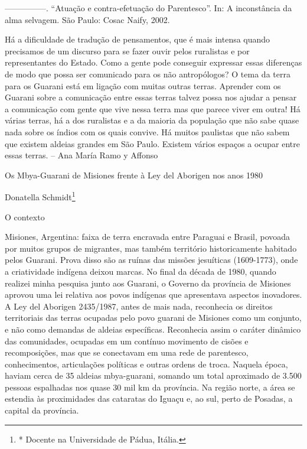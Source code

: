 \documentclass{article}
\begin{document}
{}---{}---{}---{}---{}---. {\textquotedblleft}Atua\c{c}\~ao e
contra-efetua\c{c}\~ao do Parentesco{\textquotedblright}. In: A
inconst\^ancia da alma selvagem. S\~ao Paulo: Cosac Naify, 2002.

H\'a a dificuldade de tradu\c{c}\~ao de pensamentos, que \'e mais
intensa quando precisamos de um discurso para se fazer ouvir pelos
ruralistas e por representantes do Estado. Como a gente pode conseguir
expressar essas diferen\c{c}as de modo que possa ser comunicado para os
n\~ao antrop\'ologos? O tema da terra para os Guarani est\'a em
liga\c{c}\~ao com muitas outras terras. Aprender com os Guarani sobre a
comunica\c{c}\~ao entre essas terras talvez possa nos ajudar a pensar a
comunica\c{c}\~ao com gente que vive nessa terra mas que parece viver
em outra! H\'a v\'arias terras, h\'a a dos ruralistas e a da maioria da
popula\c{c}\~ao que n\~ao sabe quase nada sobre os \'indios com os
quais convive. H\'a muitos paulistas que n\~ao sabem que existem
aldeias grandes em S\~ao Paulo. Existem v\'arios espa\c{c}os a ocupar
entre essas terras. -- Ana Mar\'ia Ramo y Affonso

Os Mbya-Guarani de Misiones frente \`a Ley del Aborigen nos anos 1980

Donatella Schmidt\footnote{* Docente na Universidade de P\'adua,
It\'alia.}

O contexto

Misiones, Argentina: faixa de terra encravada entre Paraguai e Brasil,
povoada por muitos grupos de migrantes, mas tamb\'em territ\'orio
historicamente habitado pelos Guarani. Prova disso s\~ao as ru\'inas
das miss\~oes jesu\'iticas (1609-1773), onde a criatividade ind\'igena
deixou marcas. No final da d\'ecada de 1980, quando realizei minha
pesquisa junto aos Guarani, o Governo da prov\'incia de Misiones
aprovou uma lei relativa aos povos ind\'igenas que apresentava aspectos
inovadores. A Ley del Aborigen 2435/1987, antes de mais nada,
reconhecia os direitos territoriais das terras ocupadas pelo povo
guarani de Misiones como um conjunto, e n\~ao como demandas de aldeias
espec\'ificas. Reconhecia assim o car\'ater din\^amico das comunidades,
ocupadas em um cont\'inuo movimento de cis\~oes e recomposi\c{c}\~oes,
mas que se conectavam em uma rede de parentesco, conhecimentos,
articula\c{c}\~oes pol\'iticas e outras ordens de troca. Naquela
\'epoca, haviam cerca de 35 aldeias mbya-guarani, somando um total
aproximado de 3.500 pessoas espalhadas nos quase 30 mil
km{\texttwosuperior} da prov\'incia. Na regi\~ao norte, a \'area se
estendia \`as proximidades das cataratas do Igua\c{c}u e, ao sul, perto
de Posadas, a capital da prov\'incia.
\end{document}
